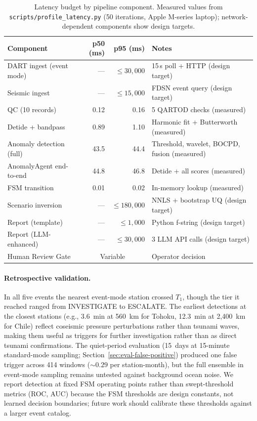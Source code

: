 \documentclass{article}
\begin{document}
\begin{table}[ht]
\centering
\caption{Latency budget by pipeline component.
  Measured values from \texttt{scripts/profile\_latency.py}
  (50 iterations, Apple M-series laptop);
  network-dependent components show design targets.}
\label{tab:latency}
\small
\begin{tabular}{lrrl}
\toprule
\textbf{Component} & \textbf{p50 (ms)} & \textbf{p95 (ms)} & \textbf{Notes} \\
\midrule
DART ingest (event mode) & --- & $\leq 30{,}000$ & 15\,s poll + HTTP (design target) \\
Seismic ingest & --- & $\leq 15{,}000$ & FDSN event query (design target) \\
QC (10 records) & 0.12 & 0.16 & 5 QARTOD checks (measured) \\
Detide + bandpass & 0.89 & 1.10 & Harmonic fit + Butterworth (measured) \\
Anomaly detection (full) & 43.5 & 44.4 & Threshold, wavelet, BOCPD, fusion (measured) \\
AnomalyAgent end-to-end & 44.8 & 46.8 & Detide + all scores (measured) \\
FSM transition & 0.01 & 0.02 & In-memory lookup (measured) \\
Scenario inversion & --- & $\leq 180{,}000$ & NNLS + bootstrap UQ (design target) \\
Report (template) & --- & $\leq 1{,}000$ & Python f-string (design target) \\
Report (LLM-enhanced) & --- & $\leq 30{,}000$ & 3 LLM API calls (design target) \\
Human Review Gate & \multicolumn{2}{c}{Variable} & Operator decision \\
\bottomrule
\end{tabular}
\end{table}

\paragraph{Retrospective validation.}
In all five events the nearest event-mode station crossed $T_1$,
though the tier it reached ranged from INVESTIGATE to ESCALATE.
The earliest detections at the
closest stations (e.g., 3.6~min at 560~km for Tohoku, 12.3~min at
2{,}400~km for Chile) reflect coseismic pressure perturbations rather
than tsunami waves, making them useful as triggers for further
investigation rather than as direct tsunami confirmations.
The quiet-period evaluation (15~days at 15-minute standard-mode
sampling; Section~\ref{sec:eval-false-positive}) produced one false trigger
across 414 windows (${\sim}0.29$ per station-month), but the full
ensemble in event-mode sampling remains untested against background
ocean noise.
We report detection at fixed FSM operating points rather than
swept-threshold metrics (ROC, AUC) because the FSM thresholds are
design constants, not learned decision boundaries; future work
should calibrate these thresholds against a larger event catalog.
\end{document}
